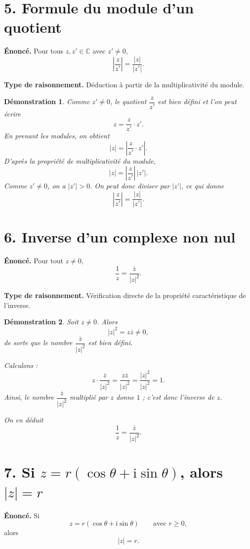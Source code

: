 \documentclass[11pt,a4paper]{article}
\newtheorem{prop}{Démonstration}
\newcommand{\C}{\mathbb{C}}
\newcommand{\ii}{\mathrm{i}}
\begin{document}
\section*{5. Formule du module d'un quotient}

\textbf{Énoncé.} Pour tous $z,z'\in\C$ avec $z'\neq 0$,
\[
\left|\frac{z}{z'}\right|=\frac{|z|}{|z'|}.
\]

\textbf{Type de raisonnement.} Déduction à partir de la multiplicativité du module.

\begin{prop}
Comme $z'\neq 0$, le quotient $\dfrac{z}{z'}$ est bien défini et l'on peut écrire
\[
z=\frac{z}{z'}\cdot z'.
\]
En prenant les modules, on obtient
\[
|z|=\left|\frac{z}{z'}\cdot z'\right|.
\]
D'après la propriété de multiplicativité du module,
\[
|z|=\left|\frac{z}{z'}\right|\,|z'|.
\]
Comme $z'\neq 0$, on a $|z'|>0$. On peut donc diviser par $|z'|$, ce qui donne
\[
\left|\frac{z}{z'}\right|=\frac{|z|}{|z'|}.
\]
\end{prop}

\section*{6. Inverse d'un complexe non nul}

\textbf{Énoncé.} Pour tout $z\neq 0$,
\[
\frac{1}{z}=\frac{\overline z}{|z|^2}.
\]

\textbf{Type de raisonnement.} Vérification directe de la propriété caractéristique de l'inverse.

\begin{prop}
Soit $z\neq 0$. Alors
\[
|z|^2=z\overline z\neq 0,
\]
de sorte que le nombre $\dfrac{\overline z}{|z|^2}$ est bien défini.

Calculons :
\[
z\cdot \frac{\overline z}{|z|^2}
=\frac{z\overline z}{|z|^2}
=\frac{|z|^2}{|z|^2}
=1.
\]
Ainsi, le nombre $\dfrac{\overline z}{|z|^2}$ multiplié par $z$ donne $1$ ; c'est donc l'inverse de $z$.

On en déduit
\[
\frac{1}{z}=\frac{\overline z}{|z|^2}.
\]
\end{prop}

\section*{7. Si \texorpdfstring{$z=r(\cos\theta+\ii\sin\theta)$}{z=r(cosθ+i sinθ)}, alors \texorpdfstring{$|z|=r$}{|z|=r}}

\textbf{Énoncé.} Si
\[
z=r(\cos\theta+\ii\sin\theta)
\qquad \text{avec } r\geq 0,
\]
alors
\[
|z|=r.
\]
\end{document}
